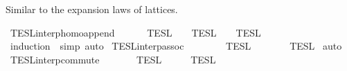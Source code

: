 \begin{isabellebody}
\begin{isamarkuptext}
Similar to the expansion laws of lattices.%
\end{isamarkuptext}\isamarkuptrue%
\isamarkupfalse%
\ TESL{\isacharunderscore}interp{\isacharunderscore}homo{\isacharunderscore}append{\isacharcolon}\isanewline
\ \ {\isacartoucheopen}{\isasymlbrakk}{\isasymlbrakk}\ {\isasymPhi}\ {\isacharat}\ {\isasymPhi}\ {\isasymrbrakk}{\isasymrbrakk}\isactrlsub T\isactrlsub E\isactrlsub S\isactrlsub L\ {\isacharequal}\ {\isasymlbrakk}{\isasymlbrakk}\ {\isasymPhi}\ {\isasymrbrakk}{\isasymrbrakk}\isactrlsub T\isactrlsub E\isactrlsub S\isactrlsub L\ {\isasyminter}\ {\isasymlbrakk}{\isasymlbrakk}\ {\isasymPhi}\ {\isasymrbrakk}{\isasymrbrakk}\isactrlsub T\isactrlsub E\isactrlsub S\isactrlsub L{\isacartoucheclose}\isanewline
%
\isadelimproof
%
\endisadelimproof
%
\isatagproof
{}\isamarkupfalse%
\ {\isacharparenleft}induction\ {\isasymPhi}\ simp{\isacharcomma}\ auto{\isacharparenright}%
\endisatagproof
{\isafoldproof}%
%
\isadelimproof
%
\endisadelimproof
%
\isadelimdocument
%
\endisadelimdocument
%
\isatagdocument
%
\isamarkuptrue%
%
\endisatagdocument
{\isafolddocument}%
%
\isadelimdocument
%
\endisadelimdocument
{}\isamarkupfalse%
\ TESL{\isacharunderscore}interp{\isacharunderscore}assoc{\isacharcolon}\isanewline
\ \ {\isacartoucheopen}{\isasymlbrakk}{\isasymlbrakk}\ {\isacharparenleft}{\isasymPhi}\ {\isacharat}\ {\isasymPhi}\ {\isacharat}\ {\isasymPhi}\ {\isasymrbrakk}{\isasymrbrakk}\isactrlsub T\isactrlsub E\isactrlsub S\isactrlsub L\ {\isacharequal}\ {\isasymlbrakk}{\isasymlbrakk}\ {\isasymPhi}\ {\isacharat}\ {\isacharparenleft}{\isasymPhi}\ {\isacharat}\ {\isasymPhi}\ {\isasymrbrakk}{\isasymrbrakk}\isactrlsub T\isactrlsub E\isactrlsub S\isactrlsub L{\isacartoucheclose}\isanewline
%
\isadelimproof
%
\endisadelimproof
%
\isatagproof
{}\isamarkupfalse%
\ auto%
\endisatagproof
{\isafoldproof}%
%
\isadelimproof
\isanewline
%
\endisadelimproof
\isanewline
{}\isamarkupfalse%
\ TESL{\isacharunderscore}interp{\isacharunderscore}commute{\isacharcolon}\isanewline
\ \ \ {\isacartoucheopen}{\isasymlbrakk}{\isasymlbrakk}\ {\isasymPhi}\ {\isacharat}\ {\isasymPhi}\ {\isasymrbrakk}{\isasymrbrakk}\isactrlsub T\isactrlsub E\isactrlsub S\isactrlsub L\ {\isacharequal}\ {\isasymlbrakk}{\isasymlbrakk}\ {\isasymPhi}\ {\isacharat}\ {\isasymPhi}\ {\isasymrbrakk}{\isasymrbrakk}\isactrlsub T\isactrlsub E\isactrlsub S\isactrlsub L{\isacartoucheclose}\isanewline

\end{isabellebody}
